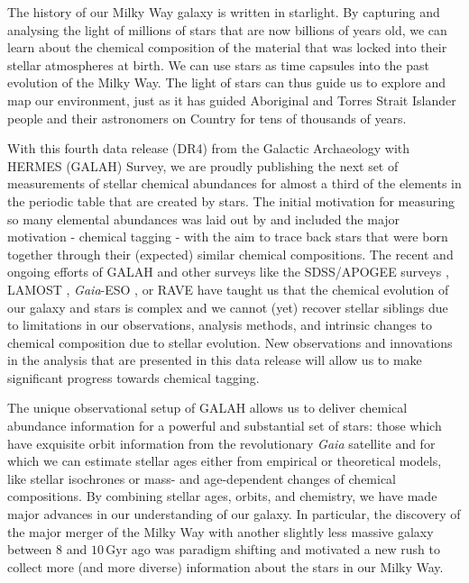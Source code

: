 \documentclass[
  journal=pasa,
  manuscript=research-paper, %
  year=2023,
  volume=37
]{cup-journal}
\newcommand{\Gaia}{\textit{Gaia}\xspace}
\begin{document}
The history of our Milky Way galaxy is written in starlight. By capturing and analysing the light of millions of stars that are now billions of years old, we can learn about the chemical composition of the material that was locked into their stellar atmospheres at birth. We can use stars as time capsules into the past evolution of the Milky Way. The light of stars can thus guide us to explore and map our environment, just as it has guided Aboriginal and Torres Strait Islander people and their astronomers on Country for tens of thousands of years.

With this fourth data release (DR4) from the Galactic Archaeology with HERMES (GALAH) Survey, we are proudly publishing the next set of measurements of stellar chemical abundances for almost a third of the elements in the periodic table that are created by stars. The initial motivation for measuring so many elemental abundances was laid out by \citet{DeSilva2015} and included the major motivation - chemical tagging - with the aim to trace back stars that were born together through their (expected) similar chemical compositions. The recent and ongoing efforts of GALAH and other surveys like the SDSS/APOGEE surveys \citep[e.g.][]{SDSSDR17, Kollmeier2017}, LAMOST \citep{Zhao2012}, \Gaia-ESO \citep{Gilmore2022}, or RAVE \citep{Steinmetz2020a} have taught us that the chemical evolution of our galaxy and stars is complex and we cannot (yet) recover stellar siblings due to limitations in our observations, analysis methods, and intrinsic changes to chemical composition due to stellar evolution. New observations and innovations in the analysis that are presented in this data release will allow us to make significant progress towards chemical tagging.

The unique observational setup of GALAH allows us to deliver chemical abundance information for a powerful and substantial set of stars: those which have exquisite orbit information from the revolutionary \Gaia satellite \citep{Gaia-Collaboration2016} and for which we can estimate stellar ages either from empirical or theoretical models, like stellar isochrones or mass- and age-dependent changes of chemical compositions. By combining stellar ages, orbits, and chemistry, we have made major advances in our understanding of our galaxy. In particular, the discovery of the major merger of the Milky Way with another slightly less massive galaxy between 8 and $10\,\mathrm{Gyr}$ ago \citep{Belokurov2018, Helmi2018} was paradigm shifting and motivated a new rush to collect more (and more diverse) information about the stars in our Milky Way.
\end{document}
